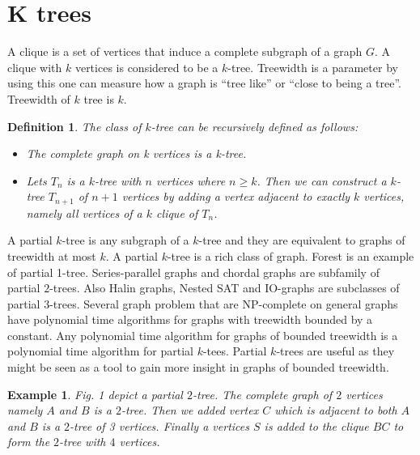 \documentclass[12pt]{article}
\newtheorem*{defi}{Definition}
\newtheorem{exmp}{Example}[section]
\begin{document}
\section{K trees}
\label{sec:ktree}
A clique is a set of vertices that induce a complete subgraph of a graph \(G\). A clique with \(k\) vertices is considered to be a \(k\)-tree. Treewidth is a parameter by using this one can measure how a graph is ``tree like'' or ``close to being a tree''. Treewidth of \(k\) tree is \(k\). 
\begin{defi}
The class of  \(k\)-tree can be recursively defined as follows: 
\begin{itemize}
 \item The complete graph on k vertices is a k-tree.
 \item Lets \(T_n\) is a \(k\)-tree  with $n$ vertices where $n\geq k$. Then we can construct a $k$-tree $T_{n+1}$ of $n+1$ vertices by adding a vertex adjacent to exactly $k$ vertices, namely all vertices of a $k$ clique of $T_n$. 
\end{itemize}

\end{defi}
  A partial \(k\)-tree is any subgraph of a \(k\)-tree and they are equivalent to graphs of treewidth at most \(k\). A partial \(k\)-tree is a rich class of graph. Forest is an example of partial 1-tree. Series-parallel graphs and chordal graphs are subfamily of partial \(2\)-trees. Also Halin graphs, Nested SAT and IO-graphs are subclasses of partial \(3\)-trees. Several graph problem that are NP-complete on general graphs have polynomial time algorithms for graphs with treewidth bounded by a constant. Any polynomial time algorithm for graphs of bounded treewidth is a polynomial time algorithm for partial \(k\)-tees. Partial \(k\)-trees are useful as they might be seen as a tool to gain more insight in graphs of bounded treewidth. 
  \begin{exmp}
  Fig. 1 depict a partial $2$-tree. The complete graph of $2$ vertices namely $A$ and $B$ is a $2$-tree. Then we added vertex $C$ which is adjacent to both $A$ and $B$ is a $2$-tree of 3 vertices. Finally a vertices $S$ is added to the clique $BC$ to form the $2$-tree with $4$ vertices.
  \end{exmp}
\end{document}

